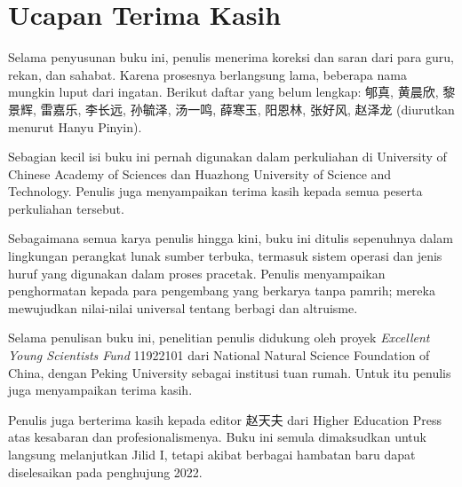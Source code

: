 
\section*{Ucapan Terima Kasih}
\hypertarget{o014.aljabr2.prelude.acknowledgments}{ }

Selama penyusunan buku ini, penulis menerima koreksi dan saran dari para guru,
rekan, dan sahabat. Karena prosesnya berlangsung lama, beberapa nama mungkin
luput dari ingatan. Berikut daftar yang belum lengkap: 郇真, 黄晨欣,
黎景辉, 雷嘉乐, 李长远, 孙毓泽, 汤一鸣, 薛寒玉, 阳恩林, 张好风, 赵泽龙
(diurutkan menurut Hanyu Pinyin).

Sebagian kecil isi buku ini pernah digunakan dalam perkuliahan di University
of Chinese Academy of Sciences dan Huazhong University of Science and
Technology. Penulis juga menyampaikan terima kasih kepada semua peserta
perkuliahan tersebut.

Sebagaimana semua karya penulis hingga kini, buku ini ditulis sepenuhnya dalam
lingkungan perangkat lunak sumber terbuka, termasuk sistem operasi dan jenis
huruf yang digunakan dalam proses pracetak. Penulis menyampaikan penghormatan
kepada para pengembang yang berkarya tanpa pamrih; mereka mewujudkan nilai-nilai
universal tentang berbagi dan altruisme.

Selama penulisan buku ini, penelitian penulis didukung oleh proyek
\emph{Excellent Young Scientists Fund} 11922101 dari National Natural Science
Foundation of China, dengan Peking University sebagai institusi tuan rumah.
Untuk itu penulis juga menyampaikan terima kasih.

Penulis juga berterima kasih kepada editor 赵天夫 dari Higher Education Press
atas kesabaran dan profesionalismenya. Buku ini semula dimaksudkan untuk
langsung melanjutkan Jilid I, tetapi akibat berbagai hambatan baru dapat
diselesaikan pada penghujung 2022.

